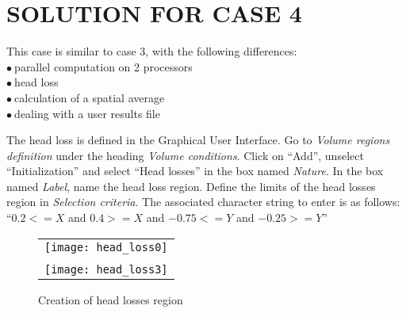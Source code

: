 %
%
%
%
%
%
%
\section{SOLUTION FOR CASE 4}
This case is similar to case 3, with the following differences:\\
\hspace*{1cm}$\bullet\ $parallel computation on 2 processors\\
\hspace*{1cm}$\bullet\ $head loss\\
\hspace*{1cm}$\bullet\ $calculation of a spatial average\\
\hspace*{1cm}$\bullet\ $dealing with a user results file

The head loss is defined in the Graphical User Interface. Go to {\itshape Volume regions definition} under the heading {\itshape Volume conditions}. Click on ``Add'', unselect ``Initialization'' and select ``Head losses'' in the box named {\itshape Nature}. In the box named {\itshape Label}, name the head loss region. Define the limits of the head losses region in {\itshape Selection criteria}. The associated character string to enter is as follows:
``$0.2 <= X$ and $0.4 >= X$ and $-0.75 <= Y$ and $-0.25 >= Y$''

\begin{figure}[h!]
\begin{center}
\begin{tabular}{c}
\texttt{[image: head\_loss0]} \\
\\
\texttt{[image: head\_loss3]}
\end{tabular}
\caption{Creation of head losses region}
\label{fig_hl1}
\end{center}
\end{figure}

